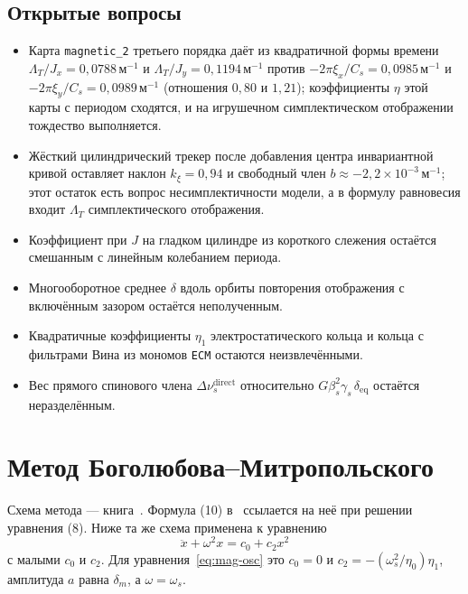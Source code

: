 \documentclass[aps,pra,preprint,a4paper,amsmath,amssymb,longbibliography]{revtex4-2}
\begin{document}
\subsection{Открытые вопросы}
\label{sec:open}

\begin{itemize}
\item Карта \texttt{magnetic\_2} третьего порядка даёт из квадратичной формы времени $\Lambda_T/J_x=0{,}0788\,\text{м}^{-1}$ и $\Lambda_T/J_y=0{,}1194\,\text{м}^{-1}$ против $-2\pi\xi_x/C_s=0{,}0985\,\text{м}^{-1}$ и $-2\pi\xi_y/C_s=0{,}0989\,\text{м}^{-1}$ (отношения $0{,}80$ и $1{,}21$); коэффициенты $\eta$ этой карты с периодом сходятся, и на игрушечном симплектическом отображении тождество выполняется.
\item Жёсткий цилиндрический трекер после добавления центра инвариантной кривой оставляет наклон $k_{\xi}=0{,}94$ и свободный член $b\approx -2{,}2\times 10^{-3}\,\text{м}^{-1}$; этот остаток есть вопрос несимплектичности модели, а в формулу равновесия входит $\Lambda_T$ симплектического отображения.
\item Коэффициент при $J$ на гладком цилиндре из короткого слежения остаётся смешанным с линейным колебанием периода.
\item Многооборотное среднее $\delta$ вдоль орбиты повторения отображения с включённым зазором остаётся неполученным.
\item Квадратичные коэффициенты $\eta_1$ электростатического кольца и кольца с фильтрами Вина из мономов \texttt{ECM} остаются неизвлечёнными.
\item Вес прямого спинового члена $\Delta\nu_s^{\mathrm{direct}}$ относительно $G\beta_s^2\gamma_s\,\delta_{\mathrm{eq}}$ остаётся неразделённым.
\end{itemize}
\appendix
\section{Метод Боголюбова--Митропольского}
\label{app:ch1bm}

Схема метода --- книга~\cite{Bogoliubov1961}. Формула (10) в~\cite{Senichev2013} ссылается на неё при решении уравнения (8). Ниже та же схема применена к уравнению
\begin{equation}
\label{eq:mag-bm-eq}
\ddot x+\omega^2 x=c_0+c_2 x^2
\end{equation}
с малыми $c_0$ и $c_2$. Для уравнения~\eqref{eq:mag-osc} это $c_0=0$ и $c_2=-(\omega_s^2/\eta_0)\eta_1$, амплитуда $a$ равна $\delta_m$, а $\omega=\omega_s$.
\end{document}
